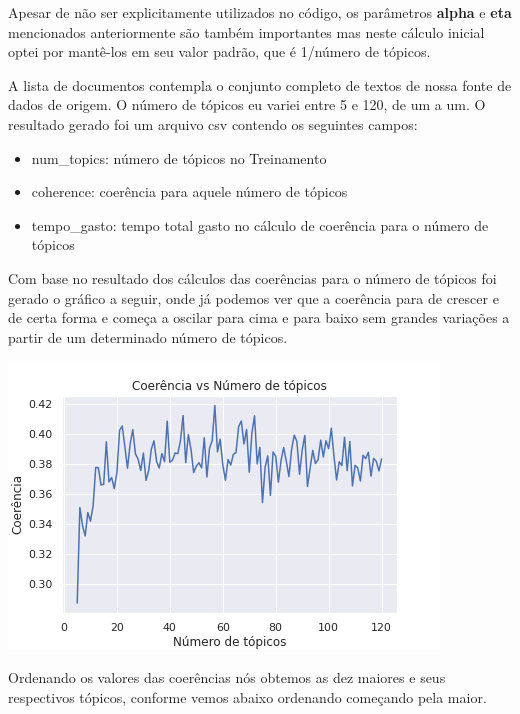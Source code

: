 Apesar de não ser explicitamente utilizados no código, os parâmetros \textbf{alpha} e \textbf{eta} mencionados anteriormente são também importantes mas neste cálculo inicial
optei por mantê-los em seu valor padrão, que é 1/número de tópicos. 

A lista de documentos contempla o conjunto completo de textos de nossa fonte de dados de origem. O número de tópicos eu variei entre 5 e 120, de um 
a um. O resultado gerado foi um arquivo csv contendo os seguintes campos:

\begin{itemize}
    \item num\_topics: número de tópicos no Treinamento
    \item coherence: coerência para aquele número de tópicos
    \item tempo\_gasto: tempo total gasto no cálculo de coerência para o número de tópicos
\end{itemize}

Com base no resultado dos cálculos das coerências para o número de tópicos foi gerado o gráfico a seguir, onde já podemos ver que a coerência para 
de crescer e de certa forma e começa a oscilar para cima e para baixo sem grandes variações a partir de um determinado número de tópicos.

\includegraphics{treinamento/resources/coerencia_vs_topicos.png}

Ordenando os valores das coerências nós obtemos as dez maiores e seus respectivos tópicos, conforme vemos abaixo ordenando começando pela maior.

